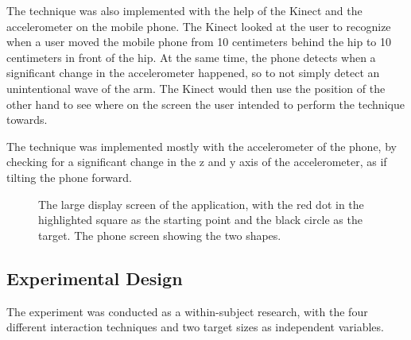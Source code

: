 The \throw technique was also implemented with the help of the Kinect and the accelerometer on the mobile phone. 
The Kinect looked at the user to recognize when a user moved the mobile phone from 10 centimeters behind the hip to 10 centimeters in front of the hip. 
At the same time, the phone detects when a significant change in the accelerometer happened, so to not simply detect an unintentional wave of the arm. 
The Kinect would then use the position of the other hand to see where on the screen the user intended to perform the \throw technique towards. 

The \tilt technique was implemented mostly with the accelerometer of the phone, by checking for a significant change in the z and y axis of the accelerometer, as if tilting the phone forward. 

\begin{figure}[H]
	\centering
	\qquad
	\caption{
		\protect{} The large display screen of the application, with the red dot in the highlighted square as the starting point and the black circle as the target.
		\protect{} The phone screen showing the two shapes.
	}
	\label{fig:allSetup}
\end{figure} 

\subsection{Experimental Design}\label{sec:expdesign}
The experiment was conducted as a within-subject research, with the four different interaction techniques and two target sizes as independent variables. 


